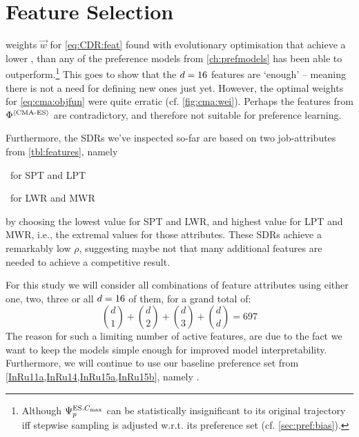 
\chapter{Feature Selection}\label{ch:featselect}

 weights $\vec{w}$ 
for \cref{eq:CDR:feat} found with evolutionary optimisation that achieve a 
lower \namerho, than any of the preference models from \cref{ch:prefmodels}
has been able to outperform.\footnote{Although $\Psi^{\text{ES}.{C_{\max}}}_{p}$ can be 
  statistically insignificant to its original trajectory iff stepwise 
  sampling is adjusted w.r.t. its preference set (cf. \cref{sec:pref:bias}).} 
This goes to show that the $d=16$ features are `enough' -- 
meaning there is not a need for defining new ones just yet. 
However, the optimal weights for \cref{eq:cma:objfun} were quite erratic (cf. 
\cref{fig:cma:wei}). 
Perhaps the features from $\Phi^{\langle \text{CMA-ES} \rangle}$ are 
contradictory, and therefore not suitable for preference learning. 

Furthermore, the SDRs we've inspected so-far are based on two job-attributes 
from \cref{tbl:features}, namely
\begin{enumerate*}[after={{,}}]
  \item \phiproc\ for SPT and LPT 
  \item \phijobWrm\ for LWR and MWR 
\end{enumerate*}
by choosing the lowest value for SPT and LWR, and highest value for LPT and 
MWR, i.e., the extremal values for those attributes. 
These SDRs achieve a remarkably low $\rho$, suggesting maybe not that many 
additional features are needed to achieve a competitive result.

For this study we will consider all combinations of feature attributes using 
either one, two, three or all $d=16$ of them, for a grand total of:
\begin{equation}\label{eq:697}
{d \choose 1}+{d \choose 2}+{d \choose 3}+{d \choose d} = 697
\end{equation}
The reason for such a limiting number of active features, are due to the fact 
we want to keep the models simple enough for improved model interpretability.
Furthermore, we will continue to use our baseline preference set from 
\cref{InRu11a,InRu14,InRu15a,InRu15b}, namely .

